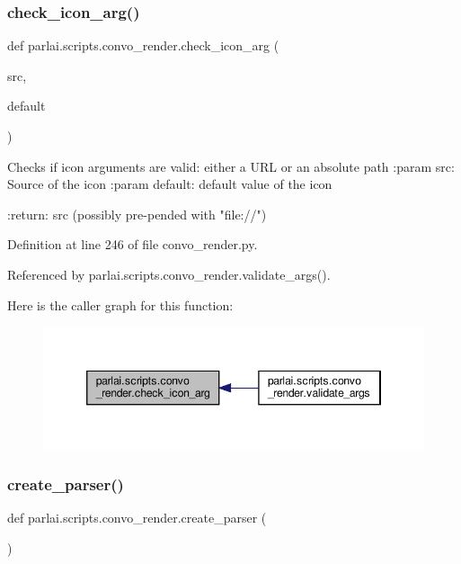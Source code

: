 \subsubsection{\texorpdfstring{check\+\_\+icon\+\_\+arg()}{check\_icon\_arg()}}
{\footnotesize\ttfamily def parlai.\+scripts.\+convo\+\_\+render.\+check\+\_\+icon\+\_\+arg (\begin{DoxyParamCaption}\item[{}]{src,  }\item[{}]{default }\end{DoxyParamCaption})}

\begin{DoxyVerb}Checks if icon arguments are valid: either a URL or an absolute path
:param src: Source of the icon
:param default: default value of the icon

:return: src (possibly pre-pended with "file://")
\end{DoxyVerb}
 

Definition at line 246 of file convo\+\_\+render.\+py.



Referenced by parlai.\+scripts.\+convo\+\_\+render.\+validate\+\_\+args().

Here is the caller graph for this function\+:
\nopagebreak
\begin{figure}[H]
\begin{center}
\leavevmode
\includegraphics[width=346pt]{namespaceparlai_1_1scripts_1_1convo__render_ac7e3c84a7f6e3b488360319b597eda18_icgraph}
\end{center}
\end{figure}
\mbox{\label{namespaceparlai_1_1scripts_1_1convo__render_a4220e40f3e0c5ac320177b6e0f3d8e83}} 
\subsubsection{\texorpdfstring{create\+\_\+parser()}{create\_parser()}}
{\footnotesize\ttfamily def parlai.\+scripts.\+convo\+\_\+render.\+create\+\_\+parser (\begin{DoxyParamCaption}{ }\end{DoxyParamCaption})}

